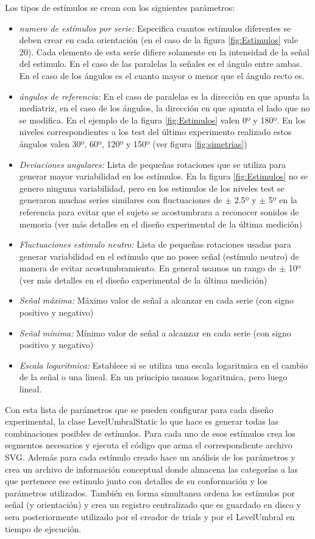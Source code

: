 \documentclass{article}
\begin{document}
    
    Los tipos de estímulos se crean con los siguientes parámetros: 
    \begin{itemize}
        \item \textit{numero de estímulos por serie:} Especifica cuantos estímulos diferentes se deben crear en cada orientación (en el caso de la figura \ref{fig:Estimulos} vale 20). Cada elemento de esta serie difiere solamente en la intensidad de la señal del estimulo. En el caso de las paralelas la señales es el ángulo entre ambas. En el caso de los ángulos es el cuanto mayor o menor que el ángulo recto es.
        \item \textit{ángulos de referencia:} En el caso de paralelas es la dirección en que apunta la mediatriz, en el caso de los ángulos, la dirección en que apunta el lado que no se modifica. En el ejemplo de la figura \ref{fig:Estimulos} valen 0º y 180º. En los niveles correspondientes a los test del último experimento realizado estos ángulos valen 30º, 60º, 120º y 150º (ver figura \ref{fig:simetrias}) 
        \item \textit{Deviaciones angulares:} Lista de pequeñas rotaciones que se utiliza para generar mayor variabilidad en los estímulos. En la figura \ref{fig:Estimulos} no se genero ninguna variabilidad, pero en los estimulos de los niveles test se generaron muchas series similares con fluctuaciones de $\pm$ 2.5º y $\pm$ 5º en la referencia para evitar que el sujeto se acostumbrara a reconocer sonidos de memoria (ver más detalles en el diseño experimental de la última medición)
        \item \textit{Fluctuaciones estimulo neutro:} Lista de pequeñas rotaciones usadas para generar variabilidad en el estimulo que no posee señal (estímulo neutro) de manera de evitar acostumbramiento. En general usamos un rango de $\pm$ 10º  (ver más detalles en el diseño experimental de la última medición)
        \item \textit{Señal máxima:} Máximo valor de señal a alcanzar en cada serie (con signo positivo y negativo)
        \item \textit{Señal mínima:} Mínimo valor de señal a alcanzar en cada serie (con signo positivo y negativo)
        \item \textit{Escala logaritmica:} Establece si se utiliza una escala logaritmica en el cambio de la señal o una lineal. En un principio usamos logaritmica, pero luego lineal. 
    \end{itemize}
    
    Con esta lista de parámetros que se pueden configurar para cada diseño experimental, la clase LevelUmbralStatic lo que hace es generar todas las combinaciones posibles de estímulos. Para cada uno de esos estímulos crea los segmentos necesarios y ejecuta el código que arma el correspondiente archivo SVG. Además para cada estímulo creado hace un análisis de los parámetros y crea un archivo de información conceptual donde almacena las categorías a las que pertenece ese estimulo junto con detalles de su conformación y los parámetros utilizados. También en forma simultanea ordena los estímulos por señal (y orientación) y crea un registro centralizado que es guardado en disco y sera posteriormente utilizado por el creador de trials y por el LevelUmbral en tiempo de ejecución.
    
\end{document}
